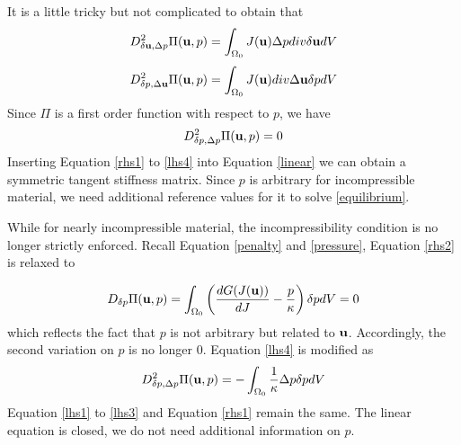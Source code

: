 It is a little tricky but not complicated to obtain that
\begin{equation} \label{lhs2}
D_{\delta\bold{u}, \Delta{p}}^2 \Pi(\bold{u}, p) = \int_{\Omega_0} J(\bold{u})\Delta{p}div\delta{\bold{u}}dV
\end{equation}
\begin{equation} \label{lhs3}
D_{\delta{p}, \Delta\bold{u}}^2 \Pi(\bold{u}, p) = \int_{\Omega_0} J(\bold{u})div\Delta{\bold{u}}\delta{p}dV
\end{equation}
Since $\Pi$ is a first order function with respect to $p$, we have
\begin{equation} \label{lhs4}
D_{\delta{p}, \Delta{p}}^2 \Pi(\bold{u}, p) = 0
\end{equation}
Inserting Equation \ref{rhs1} to \ref{lhs4} into Equation \ref{linear} we can obtain a symmetric tangent stiffness matrix. Since $p$ is arbitrary for incompressible material, we need additional reference values for it to solve \ref{equilibrium}.

While for nearly incompressible material, the incompressibility condition is no longer strictly enforced. Recall Equation \ref{penalty} and \ref{pressure}, Equation \ref{rhs2} is relaxed to

\begin{equation} \label{relation}
D_{\delta{p}}\Pi(\bold{u}, p) = \int_{\Omega_0}\left(  \frac{dG(J(\bold{u}))}{dJ} - \frac{p}{\kappa} \right)\delta{p}dV = 0
\end{equation}
which reflects the fact that $p$ is not arbitrary but related to $\bold{u}$.  
Accordingly, the second variation on $p$ is no longer $0$. Equation \ref{lhs4} is modified as
\begin{equation} \label{lhs42}
D_{\delta{p}, \Delta{p}}^2 \Pi(\bold{u}, p) = - \int_{\Omega_0}\frac{1}{\kappa}\Delta{p}\delta{p}dV
\end{equation}
Equation \ref{lhs1} to \ref{lhs3} and Equation \ref{rhs1} remain the same. The linear equation is closed, we do not need additional information on $p$.
